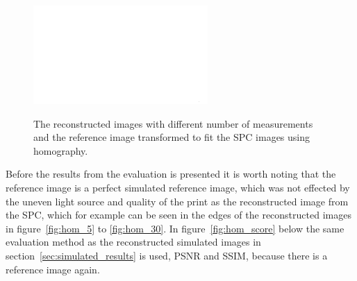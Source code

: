 \begin{figure}[H]
\begin{minipage}[t]{0.22\textwidth}
    \label{fig:hom_15}
    \includegraphics[width = \textwidth]{result/hom/im_m30.png}
    \label{fig:hom_30}
\end{minipage}
    \caption{The reconstructed images with different number of measurements and the reference image transformed to fit the SPC images using homography.}
    \label{fig:hom_over_im}
\end{figure}

Before the results from the evaluation is presented it is worth noting that the reference image is a perfect simulated reference image, which was not effected by the uneven light source and quality of the print as the reconstructed image from the SPC, which for example can be seen in the edges of the reconstructed images in figure~\ref{fig:hom_5} to \ref{fig:hom_30}. In figure~\ref{fig:hom_score} below the same evaluation method as the reconstructed simulated images in section~\ref{sec:simulated_results} is used, PSNR and SSIM, because there is a reference image again. 


